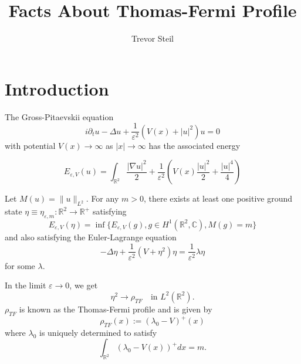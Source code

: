 \documentclass[a4paper]{article}
\title{Facts About Thomas-Fermi Profile }
\date{}
\author{Trevor Steil}
\newcommand{\R}{\mathbb{R}}
\newcommand{\C}{\mathbb{C}}
\begin{document}
\maketitle

\section{Introduction}

The Gross-Pitaevskii equation
\begin{equation}
  i \partial_t u - \Delta u + \frac{1}{\varepsilon^2} ( V(x) + |u|^2 ) u = 0
  \label{eqn:GP}
\end{equation}
with potential $V(x) \to \infty$ as $|x| \to \infty$ has the associated energy

\begin{equation}
  E_{\varepsilon, V} (u) = \int_{\R^2}^{} \frac{| \nabla u|^2}{2} + \frac{1}{\varepsilon^2} \left( V(x) \frac{|u|^2}{2} + \frac{|u|^4}{4} \right)
  \label{eqn:energy_functional}
\end{equation}

Let $M(u) = \|u\|_{L^2}$. For any $m>0$, there exists at least one positive ground state $\eta \equiv \eta_{\varepsilon, m} : \R^2 \to \R^+$
satisfying
\begin{equation}
  E_{\varepsilon, V}(\eta) = \inf \{ E_{\varepsilon, V}(g), g \in H^1( \R^2, \C), M(g) = m \}
  \label{eqn:ground_state_min}
\end{equation}
and also satisfying the Euler-Lagrange equation
\begin{equation}
  -\Delta \eta + \frac{1}{\varepsilon^2} ( V + \eta^2 ) \eta = \frac{1}{\varepsilon^2} \lambda \eta
  \label{eqn:ground_state_Euler_Lagrange}
\end{equation}
for some $\lambda$.

In the limit $\varepsilon \to 0$, we get
\[ \eta^2 \to \rho_{TF} \quad \text{in } L^2(\R^2) .\]
$\rho_{TF}$ is known as the Thomas-Fermi profile and is given by
\[ \rho_{TF}(x) := (\lambda_0 - V)^+(x) \]
where $\lambda_0$ is uniquely determined to satisfy
\[ \int_{\R^2}^{} (\lambda_0 - V(x))^+ dx = m .\]
\end{document}

